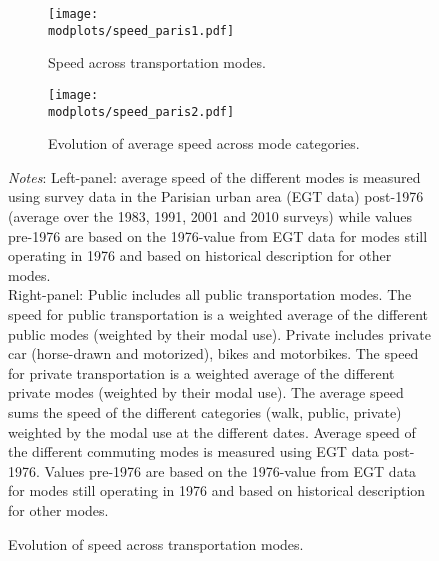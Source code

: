 \documentclass[11pt]{report}
\newcommand{\round}{revision3}  %
\newcommand{\modplots}{../../output/model/plots/\round}
\begin{document}
\vspace{1cm}
\begin{figure}[h!]	
	\hspace{-15mm}
	\begin{subfigure}{0.55\textwidth}
	\texttt{[image: \\modplots/speed\_paris1.pdf]}
\vspace{-0.1cm}
\caption{Speed across transportation modes.\label{A-fig:speed1}}
	\end{subfigure}%
	\hspace{5mm}
	\begin{subfigure}{0.55\textwidth}
	\texttt{[image: \\modplots/speed\_paris2.pdf]}
\vspace{-0.1cm}
\caption{Evolution of average speed across mode categories.\label{A-fig:speed2}}
	\end{subfigure}%
	\caption{Evolution of speed across transportation modes.}
	\footnotesize {\textit{%
		Notes}: Left-panel: average speed of the different modes is measured using survey data in the Parisian urban area (EGT data) post-1976 (average over the 1983, 1991, 2001 and 2010 surveys) while values pre-1976 are based on the 1976-value from EGT data for modes still operating in 1976 and based on historical description for other modes.\\
		Right-panel: Public includes all public transportation modes. The speed for public transportation is a weighted average of the different public modes (weighted by their modal use). Private includes private car (horse-drawn and motorized), bikes and motorbikes. The speed for private transportation is a weighted average of the different private modes (weighted by their modal use). The average speed sums the speed of the different categories (walk, public, private) weighted by the modal use at the different dates. Average speed of the different commuting modes is measured using EGT data post-1976. Values pre-1976 are based on the 1976-value from EGT data for modes still operating in 1976 and based on historical description for other modes.}
\end{figure}
\pagebreak


\end{document}
